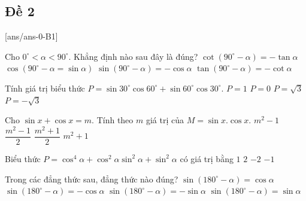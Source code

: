 \subsection{Đề 2}
[ans/ans-0-B1]
\caulc
\begin{ex}%
	Cho $0^\circ < \alpha < 90^\circ$. Khẳng định nào sau đây là đúng?
	\choice
	{ $\cot(90^\circ-\alpha)=-\tan\alpha$}
	{\True $\cos(90^\circ -\alpha = \sin \alpha)$}
	{$\sin(90^\circ - \alpha) =-\cos\alpha$}
	{$\tan(90^\circ-\alpha)= - \cot \alpha$}
\end{ex}	
\begin{ex}%
	Tính giá trị biểu thức  $P = \sin 30^\circ \cos 60^\circ  + \sin 60^\circ \cos 30^\circ $.
	\choice
	{ \True $P=1$}
	{ $P=0$}
	{$P=\sqrt{3}$}
	{$P=-\sqrt{3}$}
\end{ex}	
\begin{ex}%
	Cho $\sin x + \cos x = m$. Tính theo $m$ giá trị của $M=\sin x . \cos x$.
	\choice
	{ $m^2 -1$}
	{\True $\dfrac{m^2 -1}{2}$}
	{$\dfrac{m^2 +1}{2}$}
	{$m^2 +1$}
\end{ex}
\begin{ex}%
	Biểu thức $P = {\cos ^4}\alpha  + {\cos ^2}\alpha {\sin ^2}\alpha  + {\sin ^2}\alpha $ có giá trị bằng
	\choice
	{\True $1$}
	{ $2$}
	{$-2$}
	{$-1$}
\end{ex}
\begin{ex}%
	Trong các đẳng thức sau, đẳng thức nào đúng?
	\choice
	{ $\sin \left(180^\circ-\alpha\right) = \cos \alpha $}
	{ $\sin \left( 180^\circ -\alpha \right) =  - \cos \alpha $}
	{$\sin \left( 180^\circ-\alpha \right) =  - \sin \alpha $}
	{\True $\sin \left( 180^\circ - \alpha  \right) = \sin \alpha $}
\end{ex}

